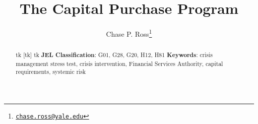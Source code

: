 \documentclass[12pt]{article}
\begin{document}
\lhead{}
\rhead{}

\renewcommand{\headrulewidth}{0.0pt}
\renewcommand{\footrulewidth}{0.0pt}

\title{The Capital Purchase Program}
\author{Chase P. Ross\thanks{\texttt{\href{mailto:chase.ross@yale.edu}{chase.ross@yale.edu}}}}


\maketitle

\begin{abstract}
tk
[tk]
tk
\newline
\newline
\textbf{JEL Classification}: G01, G28, G20, H12, H81
\newline
\textbf{Keywords}: crisis management stress test, crisis intervention, Financial Services Authority, capital requirements, systemic risk

\end{abstract}
\newpage
\tableofcontents
\newpage

\label{sec:body}


\label{sec:design}


\label{sec:evaluation}


\newpage
{}
{}
\nocite{*}

\newpage

\label{sec:resources}


\label{sec:roadmap}

\end{document}
